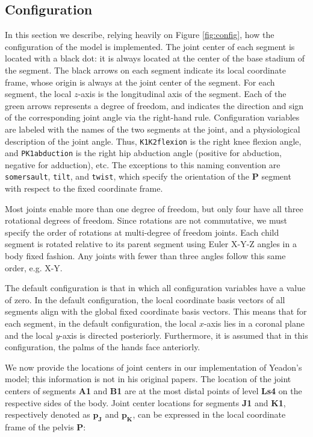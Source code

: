 \documentclass[10pt,a4paper,twocolumn]{article}
\begin{document}
\subsection*{Configuration}

In this section we describe, relying heavily on Figure \ref{fig:config}, how
the configuration of the model is implemented. The joint center of each segment
is located with a black dot: it is always located at the center of the base
stadium of the segment. The black arrows on each segment indicate its local
coordinate frame, whose origin is always at the joint center of the segment.
For each segment, the local $z$-axis is the longitudinal axis of the segment.
Each of the green arrows represents a degree of freedom, and indicates the
direction and sign of the corresponding joint angle via the right-hand rule.
Configuration variables are labeled with the names of the two segments at the
joint, and a physiological description of the joint angle. Thus,
\verb+K1K2flexion+ is the right knee flexion angle, and \verb+PK1abduction+ is
the right hip abduction angle (positive for abduction, negative for adduction),
etc. The exceptions to this naming convention are \verb+somersault+,
\verb+tilt+, and \verb+twist+, which specify the orientation of the \textbf{P}
segment with respect to the fixed coordinate frame.

Most joints enable more than one degree of freedom, but only four have all
three rotational degrees of freedom. Since rotations are not commutative,  we
must specify the order of rotations at multi-degree of freedom joints. Each
child segment is rotated relative to its parent segment using Euler X-Y-Z
angles in a body fixed fashion. Any joints with fewer than three angles follow
this same order, e.g. X-Y.

The default configuration is that in which all configuration variables have a
value of zero. In the default configuration, the local coordinate basis vectors
of all segments align with the global fixed coordinate basis vectors. This
means that for each segment, in the default configuration, the local $x$-axis
lies in a coronal plane and the local $y$-axis is directed posteriorly.
Furthermore, it is assumed that in this configuration, the palms of the hands
face anteriorly.

We now provide the locations of joint centers in our implementation of Yeadon's
model; this information is not in his original papers. The location of the
joint centers of segments \textbf{A1} and \textbf{B1} are at the most distal
points of level \textbf{Ls4} on the respective sides of the body. Joint center
locations for segments \textbf{J1} and \textbf{K1}, respectively denoted as
$\mathbf{p_J}$ and $\mathbf{p_K}$, can be expressed in the local coordinate
frame of the pelvis \textbf{P}:
\end{document}
